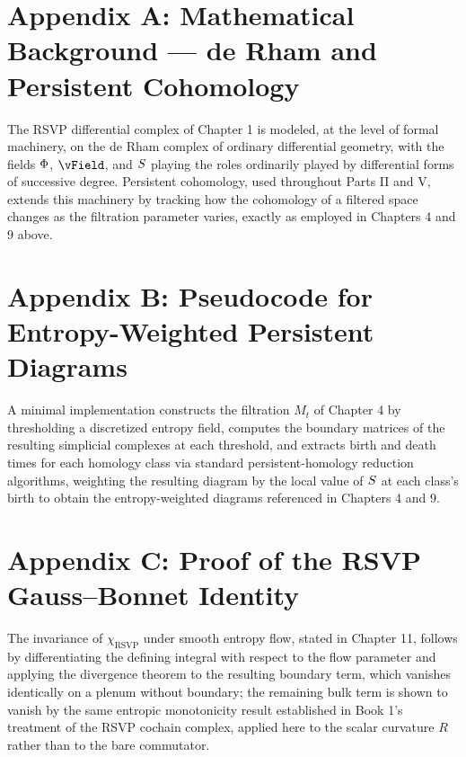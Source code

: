 \chapter*{Appendix A: Mathematical Background --- de Rham and Persistent Cohomology}

The RSVP differential complex of Chapter 1 is modeled, at the level of formal machinery, on the de Rham complex of ordinary differential geometry, with the fields $\Phi$, $\vField$, and $S$ playing the roles ordinarily played by differential forms of successive degree. Persistent cohomology, used throughout Parts II and V, extends this machinery by tracking how the cohomology of a filtered space changes as the filtration parameter varies, exactly as employed in Chapters 4 and 9 above.

\chapter*{Appendix B: Pseudocode for Entropy-Weighted Persistent Diagrams}

A minimal implementation constructs the filtration $M_t$ of Chapter 4 by thresholding a discretized entropy field, computes the boundary matrices of the resulting simplicial complexes at each threshold, and extracts birth and death times for each homology class via standard persistent-homology reduction algorithms, weighting the resulting diagram by the local value of $S$ at each class's birth to obtain the entropy-weighted diagrams referenced in Chapters 4 and 9.

\chapter*{Appendix C: Proof of the RSVP Gauss--Bonnet Identity}

The invariance of $\chi_{\mathrm{RSVP}}$ under smooth entropy flow, stated in Chapter 11, follows by differentiating the defining integral with respect to the flow parameter and applying the divergence theorem to the resulting boundary term, which vanishes identically on a plenum without boundary; the remaining bulk term is shown to vanish by the same entropic monotonicity result established in Book 1's treatment of the RSVP cochain complex, applied here to the scalar curvature $R$ rather than to the bare commutator.


